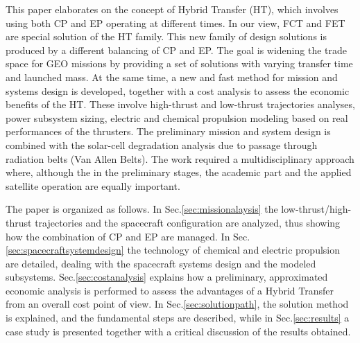 This paper elaborates on the concept of Hybrid Transfer (HT), which involves using both CP and EP operating at different times. In our view, FCT and FET are special solution of the HT family. This new family of design solutions is produced by a different balancing of CP and EP. The goal is widening the trade space for GEO missions by providing a set of solutions with varying transfer time and launched mass.
%
%
%
At the same time, a new and fast method for mission and systems design is developed, together with a cost analysis to assess the economic benefits of the HT.
These involve high-thrust and low-thrust trajectories analyses, power subsystem sizing, electric and chemical propulsion modeling based on real performances of the thrusters.
The preliminary mission and system design is combined with the solar-cell degradation analysis due to passage through radiation belts (Van Allen Belts). 
The work required a multidisciplinary approach where, although the in the preliminary stages, the academic part and the applied satellite operation are equally important.

The paper is organized as follows. In Sec.\ref{sec:missionalaysis} the low-thrust/high-thrust trajectories and the spacecraft configuration are analyzed, thus showing how the combination of CP and EP are managed. In Sec.\ref{sec:spacecraftsystemdesign} the technology of chemical and electric propulsion are detailed, dealing with the spacecraft systems design and the modeled subsystems. Sec.\ref{sec:costanalysis} explains how a preliminary, approximated economic analysis is performed to assess the advantages of a Hybrid Transfer from an overall cost point of view. In Sec.\ref{sec:solutionpath}, the solution method is explained, and the fundamental steps are described, while in Sec.\ref{sec:results} a case study is presented together with a critical discussion of the results obtained.